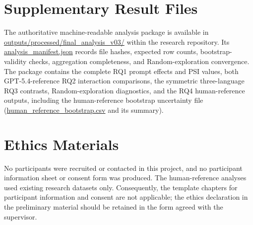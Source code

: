 \documentclass[logo,msc,inf]{infthesis}       %
\begin{document}
\section{Supplementary Result Files}
\label{app:supplementary-results}

The authoritative machine-readable analysis package is available in
\url{outputs/processed/final_analysis_v03/} within the research repository.
Its
\url{analysis_manifest.json} records file hashes, expected row counts,
bootstrap-validity checks, aggregation completeness, and Random-exploration
convergence. The package contains the complete RQ1 prompt effects and PSI
values, both GPT-5.4-reference RQ2 interaction comparisons, the symmetric
three-language RQ3 contrasts, Random-exploration diagnostics, and the RQ4
human-reference outputs, including the human-reference bootstrap uncertainty
file (\url{human_reference_bootstrap.csv} and its summary).

\section{Ethics Materials}

No participants were recruited or contacted in this project, and no participant
information sheet or consent form was produced. The human-reference analyses
used existing research datasets only. Consequently, the template chapters for
participant information and consent are not applicable; the ethics declaration
in the preliminary material should be retained in the form agreed with the
supervisor.
\end{document}
